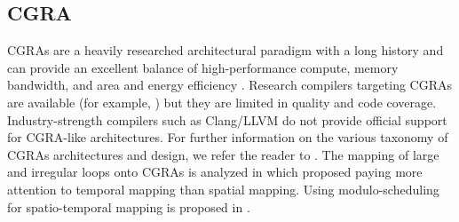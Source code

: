 \subsection{CGRA}
CGRAs are a heavily researched architectural paradigm with a long history and can provide an excellent balance of high-performance compute, memory bandwidth, and area and energy efficiency \cite{theodoridis2007survey}.
Research compilers targeting CGRAs are available (for example, \cite{adriaansen2016code, chin_cgra-me_2017, mei2003exploiting, prabhakar2018plasticine}) but they are limited in quality and code coverage. 
Industry-strength compilers such as Clang/LLVM do not provide official support for CGRA-like architectures.
For further information on the various taxonomy of CGRAs architectures and design, we refer the reader to \cite{liu_survey_2019, tehre_survey_2012}.
The mapping of large and irregular loops onto CGRAs is analyzed in \cite{zhao_towards_2020} which proposed paying more attention to temporal mapping than spatial mapping. 
Using modulo-scheduling for spatio-temporal mapping is proposed in \cite{li_chordmap_2022}.


